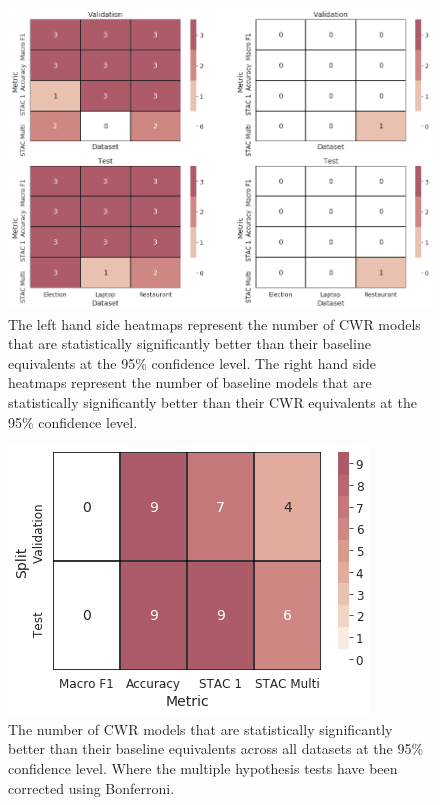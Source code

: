 \begin{figure}[!h]
    \centering
    \includegraphics[scale=0.5]{images/augmentation/methods_performance/CWR/cwr_dataset_metric_sig.png}
    \caption{The left hand side heatmaps represent the number of CWR models that are statistically significantly better than their baseline equivalents at the 95\% confidence level. The right hand side heatmaps represent the number of baseline models that are statistically significantly better than their CWR equivalents at the 95\% confidence level.}
    \label{fig:aug_cwr_dataset_metric_sig}
\end{figure}

\begin{figure}[!h]
    \centering
    \includegraphics[scale=0.6]{images/augmentation/methods_performance/CWR/cwr_sig_metric.png}
    \caption{The number of CWR models that are statistically significantly better than their baseline equivalents across all datasets at the 95\% confidence level. Where the multiple hypothesis tests have been corrected using Bonferroni.}
    \label{fig:aug_cwr_sig_metric}
\end{figure}

